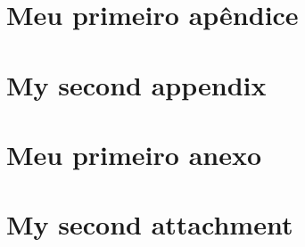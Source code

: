 \documentclass[portuguese,oneside]{tcc}
\begin{document}
\chapter{Meu primeiro apêndice}
\chapter{My second appendix}

\anexos
\chapter{Meu primeiro anexo}
\chapter{My second attachment}

\end{document}
